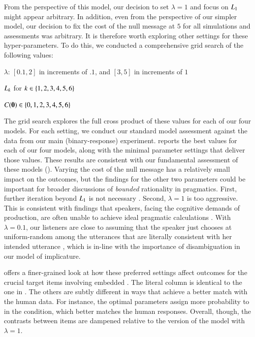 \documentclass[leqno,12pt]{article}
\begin{document}
\begin{appendix}
From the perspective of this model, our decision to set $\lambda=1$
and focus on $\UncertaintyListener[1]$ might appear arbitrary.  In
addition, even from the perspective of our simpler model, our decision
to fix the cost of the null message at $5$ for all simulations and
assessments was arbitrary. It is therefore worth exploring other
settings for these hyper-parameters. To do this, we conducted a
comprehensive grid search of the following values:
%
\begin{examples}
\item
  \begin{examples}
  \item $\lambda$: $[0.1, 2]$ in increments of $.1$, and $[3,5]$ in increments of $1$
  \item $\UncertaintyListener[k]$ for $k \in \set{1,2,3,4,5,6}$
  \item $\Costs(\nullmsg) \in \set{0, 1, 2, 3, 4, 5, 6}$
  \end{examples}
\end{examples}

The grid search explores the full cross product of these values for
each of our four models. For each setting, we conduct our standard
model assessment against the data from our main (binary-response)
experiment.  reports the best values for each of our
four models, along with the minimal parameter settings that deliver
those values. These results are consistent with our fundamental
assessment of these models ().  Varying the
cost of the null message has a relatively small impact on the
outcomes, but the findings for the other two parameters could be
important for broader discussions of \emph{bounded} rationality in
pragmatics. First, further iteration beyond $\UncertaintyListener[1]$
is not necessary \citep{Vogel-etal:2014}. Second, $\lambda=1$ is too
aggressive.  This is consistent with findings that speakers, facing
the cognitive demands of production, are often unable to achieve ideal
pragmatic calculations
\citep{pechmann1989,levelt1993,engelhardt2006,dale1995,van-deemter2012,gatt2013}. With
$\lambda=0.1$, our listeners are close to assuming that the speaker
just chooses at uniform-random among the utterances that are literally
consistent with her intended utterance \citep{McMahan:Stone:2015},
which is in-line with the importance of disambiguation in our model of
implicature.

 offers a finer-grained look at how these
preferred settings affect outcomes for the crucial target items
involving embedded . The literal column is identical to the
one in . The others are subtly different in
ways that achieve a better match with the human data. For instance,
the optimal parameters assign more probability to  in the
 condition, which better matches the human
responses. Overall, though, the contrasts between items are dampened
relative to the version of the model with $\lambda=1$.



\end{appendix}
\end{document}
